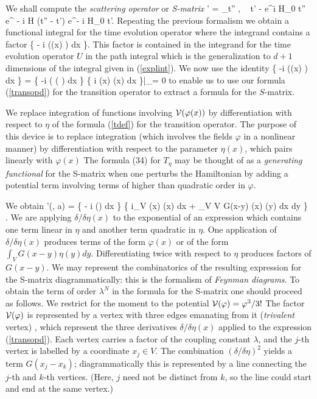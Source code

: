 We shall compute the {\em scattering operator} or {\em S-matrix}
\beq \calS' = 
\lim_{t'' \to \infty, ~ t' \to - \infty} 
e^{i H_0 t''} e^{ - i H (t'' - t') } e^{- i H_0 t'}. \eeq
Repeating the previous  formalism we obtain
a  functional integral for the time evolution operator where the 
integrand contains  a factor
\beq \exp \left \{ 
- i \lambda \int \calV (\varphi(x) ) dx \right \}. \eeq
This factor is contained in  the integrand for the time evolution operator 
$U$ in the path integral which is the 
generalization to $d+1 $ dimensions of 
the integral given in (\ref{explint}).
We now use the identity 
\beq \exp \left \{ -i \lambda \int \calV(\varphi(x) ) dx \right \} 
= \exp \left \{ -i \lambda \int \calV ( ( ) dx \right \} 
\exp \left \{ i \int \varphi(x) \eta(x) dx \right \}|_{\eta = 0 } \eeq
to enable us to use our formula (\ref{transopd}) 
for the transition operator to extract a formula for the $S$-matrix.

We replace integration of functions involving ${\mbox{$\cal V$}}(\varphi(x))$ by
differentiation with respect to $\eta$ of the formula (\ref{tdef}) for the 
transition operator. The purpose of this device is to replace
integration (which involves the fields $\varphi$ in a nonlinear manner)
by differentiation with respect to the parameter $\eta(x)$, which
pairs linearly with $\varphi(x)$
The formula (34) for 
 $T_\eta$ may be thought of as a {\em generating functional}
for the S-matrix when one perturbs the Hamiltonian by adding
a potential term involving terms of higher than quadratic order in 
$\varphi$. 

We obtain
\beq \label{smat}
\calS'(\astar, a) = 
\exp \left \{ - i \lambda \int \calV () dx 
\right \} 
 \exp \left \{ i\int_V \eta(x) \varphi(x) dx + 
 \int_{V \times V} G(x-y) \eta(x) \eta (y) dx dy 
\right \} . \eeq
We are applying $\delta/\delta \eta(x) $ to the exponential of an 
expression which contains one term linear in $\eta$ and another
term quadratic in $\eta$. One application 
of $\delta/\delta \eta(x)$ 
produces terms of the form $\varphi(x)$ or of the form 
$\int_V G(x-y) \eta(y) dy. $ 
Differentiating twice with respect to $\eta$ produces 
factors of $G(x-y)$. 
We may represent the combinatorics of the resulting expression for the 
S-matrix diagrammatically: this is the formalism of {\em 
Feynman diagrams}.  To obtain the 
term of order $\lambda^N$ in the formula for the S-matrix one should 
proceed as follows.
 We restrict for the moment to the potential ${\mbox{$\cal V$}}(\varphi) 
= \varphi^3/3!$  The factor ${\mbox{$\cal V$}}(\varphi)$ is represented by a 
vertex with three edges emanating from it ({\em trivalent} vertex) , which
represent the three derivatives $\delta/\delta \eta(x)$ applied to the 
expression (\ref{transopd}). Each vertex 
carries a factor of the coupling constant $\lambda$, and the $j$-th
vertex is 
labelled by a coordinate $x_j \in V$. 
The combination $(\delta/\delta \eta)^2$ yields a 
term $G(x_j - x_k)$; diagrammatically this is 
represented by a line connecting the $j$-th and 
$k$-th vertices. (Here, $j$ need not be distinct from $k$, so 
the line could start and end at the same vertex.) 

